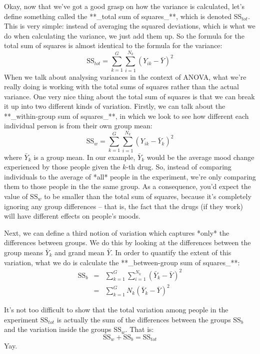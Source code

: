 Okay, now that we've got a good grasp on how the variance is calculated, let's define something called the **_total sum of squares_**, which is denoted SS$_{tot}$. This is very simple: instead of averaging the squared deviations, which is what we do when calculating the variance, we just add them up. So the formula for the total sum of squares is almost identical to the formula for the variance:
$$
\mbox{SS}_{tot} = \sum_{k=1}^G \sum_{i=1}^{N_k} \left(Y_{ik} - \bar{Y} \right)^2
$$ 
When we talk about analysing variances in the context of ANOVA, what we're really doing is working with the total sums of squares rather than the actual variance. One very nice thing about the total sum of squares is that we can break it up into two different kinds of variation. Firstly, we can talk about the **_within-group sum of squares_**, in which we look to see how different each individual person is from their own group mean:
$$
\mbox{SS}_w = \sum_{k=1}^G \sum_{i=1}^{N_k} \left( Y_{ik} - \bar{Y}_k \right)^2
$$
where $\bar{Y}_k$ is a group mean. In our example, $\bar{Y}_k$ would be the average mood change experienced by those people given  the $k$-th drug. So, instead of comparing individuals to the average of *all* people in the experiment, we're only comparing them to those people in the the same group. As a consequence, you'd expect the value of $\mbox{SS}_w$ to be smaller than the total sum of squares, because it's completely ignoring any group differences -- that is, the fact that the drugs (if they work) will have different effects on people's moods.
 
Next, we can define a third notion of variation which captures *only* the differences between groups. We do this by looking at the differences between the group means $\bar{Y}_k$ and grand mean $\bar{Y}$. In order to quantify the extent of this variation, what we do is calculate the **_between-group sum of squares_**:
\begin{eqnarray*}
\mbox{SS}_{b} &=& \sum_{k=1}^G \sum_{i=1}^{N_k} \left( \bar{Y}_k - \bar{Y} \right)^2 \\
&=& \sum_{k=1}^G N_k \left( \bar{Y}_k - \bar{Y} \right)^2
\end{eqnarray*}

It's not too difficult to show that the total variation among people in the experiment $\mbox{SS}_{tot}$ is actually the sum of the differences between the groups $\mbox{SS}_b$ and the variation inside the groups $\mbox{SS}_w$. That is:
$$
\mbox{SS}_w  + \mbox{SS}_{b} = \mbox{SS}_{tot}
$$
Yay.

